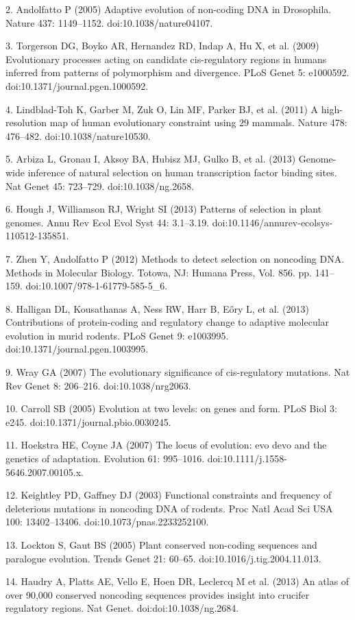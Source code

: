 2.	Andolfatto P (2005) Adaptive evolution of non-coding DNA in Drosophila. Nature 437: 1149–1152. doi:10.1038/nature04107.

3.	Torgerson DG, Boyko AR, Hernandez RD, Indap A, Hu X, et al. (2009) Evolutionary processes acting on candidate cis-regulatory regions in humans inferred from patterns of polymorphism and divergence. PLoS Genet 5: e1000592. doi:10.1371/journal.pgen.1000592.

4.	Lindblad-Toh K, Garber M, Zuk O, Lin MF, Parker BJ, et al. (2011) A high-resolution map of human evolutionary constraint using 29 mammals. Nature 478: 476–482. doi:10.1038/nature10530.

5.	Arbiza L, Gronau I, Aksoy BA, Hubisz MJ, Gulko B, et al. (2013) Genome-wide inference of natural selection on human transcription factor binding sites. Nat Genet 45: 723–729. doi:10.1038/ng.2658.

6.	Hough J, Williamson RJ, Wright SI (2013) Patterns of selection in plant genomes. Annu Rev Ecol Evol Syst 44: 3.1–3.19. doi:10.1146/annurev-ecolsys-110512-135851.

7.	Zhen Y, Andolfatto P (2012) Methods to detect selection on noncoding DNA. Methods in Molecular Biology. Totowa, NJ: Humana Press, Vol. 856. pp. 141–159. doi:10.1007/978-1-61779-585-5\_6.

8.	Halligan DL, Kousathanas A, Ness RW, Harr B, Eőry L, et al. (2013) Contributions of protein-coding and regulatory change to adaptive molecular evolution in murid rodents. PLoS Genet 9: e1003995. doi:10.1371/journal.pgen.1003995.

9.	Wray GA (2007) The evolutionary significance of cis-regulatory mutations. Nat Rev Genet 8: 206–216. doi:10.1038/nrg2063.

10.	Carroll SB (2005) Evolution at two levels: on genes and form. PLoS Biol 3: e245. doi:10.1371/journal.pbio.0030245.

11.	Hoekstra HE, Coyne JA (2007) The locus of evolution: evo devo and the genetics of adaptation. Evolution 61: 995–1016. doi:10.1111/j.1558-5646.2007.00105.x.

12.	Keightley PD, Gaffney DJ (2003) Functional constraints and frequency of deleterious mutations in noncoding DNA of rodents. Proc Natl Acad Sci USA 100: 13402–13406. doi:10.1073/pnas.2233252100.

13.	Lockton S, Gaut BS (2005) Plant conserved non-coding sequences and paralogue evolution. Trends Genet 21: 60–65. doi:10.1016/j.tig.2004.11.013.

14.	Haudry A, Platts AE, Vello E, Hoen DR, Leclercq M et al. (2013) An atlas of over 90,000 conserved noncoding sequences provides insight into crucifer regulatory regions. Nat Genet. doi:doi:10.1038/ng.2684.

